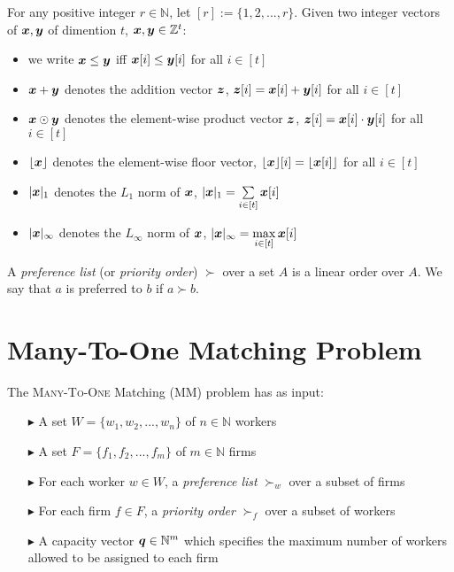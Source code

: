 For any positive integer $r \in \mathbb{N}$, let $[r] := \{ 1, 2, ..., r \}$. Given two integer vectors of $\boldsymbol{x}, \boldsymbol{y}$ of dimention $t$, \ie $\boldsymbol{x}, \boldsymbol{y} \in \mathbb{Z}^t$:

\begin{itemize}
  \item we write $\boldsymbol{x} \leq \boldsymbol{y}$ iff $\boldsymbol{x}[i] \leq \boldsymbol{y}[i]$ for all $i \in [t]$
  \item $\boldsymbol{x} + \boldsymbol{y}$ denotes the addition vector $\boldsymbol{z}$, \ie $\boldsymbol{z}[i] = \boldsymbol{x}[i] + \boldsymbol{y}[i]$ for all $i \in [t]$
  \item $\boldsymbol{x} \odot \boldsymbol{y}$ denotes the element-wise product vector $\boldsymbol{z}$, \ie $\boldsymbol{z}[i] = \boldsymbol{x}[i] \cdot \boldsymbol{y}[i]$ for all $i \in [t]$
  \item $\lfloor \boldsymbol{x} \rfloor$ denotes the element-wise floor vector, \ie $\lfloor \boldsymbol{x} \rfloor [i] = \lfloor \boldsymbol{x}[i] \rfloor$ for all $i \in [t]$
  \item $|\boldsymbol{x}|_1$ denotes the $L_1$ norm of $\boldsymbol{x}$, \ie $|\boldsymbol{x}|_1 = \sum\limits_{i \in [t]} \boldsymbol{x}[i]$
  \item $|\boldsymbol{x}|_\infty$ denotes the $L_\infty$ norm of $\boldsymbol{x}$, \ie $|\boldsymbol{x}|_\infty = \max\limits_{i \in [t]} \boldsymbol{x}[i]$
\end{itemize}

A \textit{preference list} (or \textit{priority order}) $\succ$ over a set $A$ is a linear order over $A$. We say that $a$ is preferred to $b$ if $a \succ b$.

\section{Many-To-One Matching Problem}

The \textsc{Many-To-One} Matching (MM) problem has as input:
\begin{itemize}
  \item[$\blacktriangleright$] A set $W = \{ w_1, w_2, ..., w_n \}$ of $n \in \mathbb{N}$ workers
  \item[$\blacktriangleright$] A set $F = \{ f_1, f_2, ..., f_m \}$ of $m \in \mathbb{N}$ firms
  \item[$\blacktriangleright$] For each worker $w \in W$, a \textit{preference list} $\succ_w$ over a subset of firms
  \item[$\blacktriangleright$] For each firm $f \in F$, a \textit{priority order} $\succ_f$ over a subset of workers
  \item[$\blacktriangleright$] A capacity vector $\boldsymbol{q} \in \mathbb{N}^m$ which specifies the maximum number of workers allowed to be assigned to each firm
\end{itemize}

